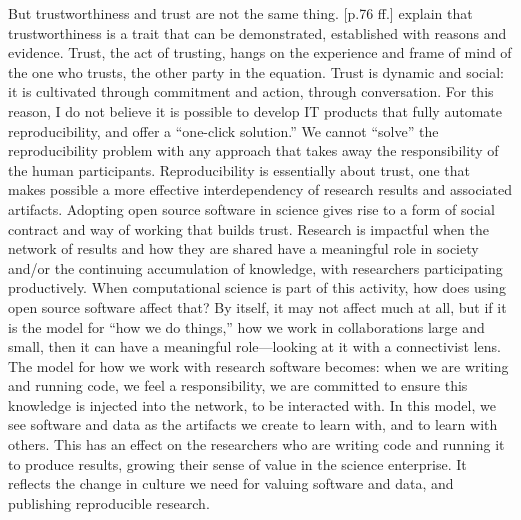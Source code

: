 \documentclass{statement}
\begin{document}
But trustworthiness and trust are not the same thing. 
\cite{solomon-flores2003} [p.76 ff.] explain that trustworthiness is a trait that can be demonstrated, established with reasons and evidence. 
Trust, the act of trusting, hangs on the experience and frame of mind of the one who trusts, the other party in the equation. 
Trust is dynamic and social: it is cultivated through commitment and action, through conversation. 
For this reason, I do not believe it is possible to develop IT products that fully automate reproducibility, and offer a ``one-click solution.'' 
We cannot ``solve'' the reproducibility problem with any approach that takes away the responsibility of the human participants. 
Reproducibility is essentially about trust, one that makes possible a more effective interdependency of research results and associated artifacts. 
Adopting open source software in science gives rise to a form of social contract and way of working that builds trust. 
Research is impactful when the network of results and how they are shared have a meaningful role in society and/or the continuing accumulation of knowledge, with researchers participating productively. 
When computational science is part of this activity, how does using open source software affect that? 
By itself, it may not affect much at all, but if it is the model for ``how we do things,'' how we work in collaborations large and small, then it can have a meaningful role---looking at it with a connectivist lens. 
The model for how we work with research software becomes: when we are writing and running code, we feel a responsibility, we are committed to ensure this knowledge is injected into the network, to be interacted with. 
In this model, we see software and data as the artifacts we create to learn with, and to learn with others. 
This has an effect on the researchers who are writing code and running it to produce results, growing their sense of value in the science enterprise. 
It reflects the change in culture we need for valuing software and data, and publishing reproducible research.



{\small


}



\end{document}
